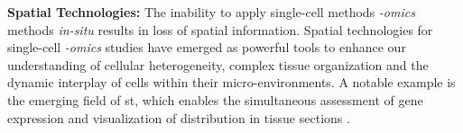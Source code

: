 \textbf{Spatial Technologies: } %
The inability to apply single-cell methods \textit{-omics} methods \textit{in-situ} results in loss of spatial information. Spatial technologies for single-cell \textit{-omics} studies have emerged as powerful tools to enhance our understanding of cellular heterogeneity, complex tissue organization and the dynamic interplay of cells within their micro-environments. A notable example is the emerging field of \gls{st}, which enables the simultaneous assessment of gene expression and visualization of  distribution in tissue sections \textbf{\cite{moses_museum_2022,tian_expanding_2023}}.\\ %








